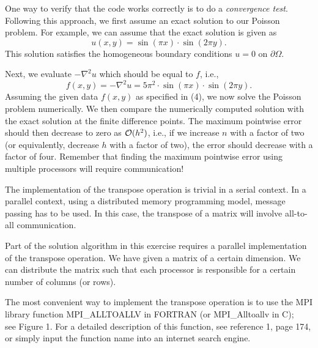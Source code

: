 \documentclass[11pt]{article}
\begin{document}
\vspace{.3in}



One way to verify that the code works correctly is to do 
a {\em convergence test}. Following this approach, we first assume 
an exact solution to our Poisson problem. For example, we can assume 
that the exact solution is given as 
\begin{equation}
u(x,y) = \sin(\pi x)\cdot \sin(2\pi y) .
\end{equation}
This solution satisfies the homogeneous boundary conditions 
$u=0$ on $\partial\Omega$. 

Next, we evaluate $-\nabla^2 u$ which should be equal to $f$, i.e.,
\begin{equation}
f(x,y) = -\nabla^2 u = 5\pi^2\cdot \sin(\pi x)\cdot \sin(2\pi y) .
\end{equation}
Assuming the given data $f(x,y)$ as specified in (4), we now solve the 
Poisson problem numerically. We then compare the numerically computed
solution with the exact solution at the finite difference points. 
The maximum pointwise error should then decrease to zero as ${\cal
  O}(h^2)$, i.e., if we increase $n$ with a factor of two (or 
equivalently, decrease $h$ with a factor of two), the error should 
decrease with a factor of four. 
Remember that finding the maximum pointwise error using multiple 
processors will require communication!


The implementation of the transpose operation is trivial in a 
serial context. In a parallel context, using a distributed 
memory programming model, message passing has to be used. 
In this case, the transpose of a matrix will involve all-to-all 
communication. 

Part of the solution algorithm in this exercise requires 
a parallel implementation of the transpose operation. 
We have given a matrix of a certain dimension. 
We can distribute the matrix such that each processor 
is responsible for a certain number of columns (or rows). 

The most convenient way to implement the transpose operation 
is to use the MPI library function \textrm{MPI\_ALLTOALLV} in FORTRAN 
(or \textrm{MPI\_Alltoallv} in C);\\
see Figure 1. For a detailed description of this function, 
see reference 1, page 174, or simply input the function name into an internet
search engine.
\end{document}
